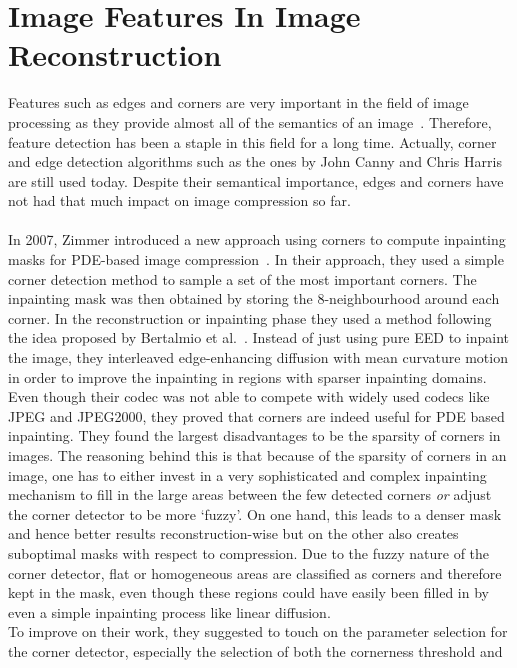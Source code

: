 \section{Image Features In Image Reconstruction}
Features such as edges and corners are very important in the field of image processing as they
provide almost all of the semantics of an image~\cite{marr82}. Therefore, feature detection has been a staple in
this field for a long time. Actually, corner and edge detection algorithms such as the ones by John Canny
and Chris Harris~\cite{harris88, canny86} are still used today. 
Despite their semantical importance, edges and corners have not had that much impact on image
compression so far.\\
\\
In 2007, Zimmer introduced a new approach using corners to compute inpainting masks for
PDE-based image compression~\cite{zimmer07}. In their approach, they used a simple corner detection method to
sample a set of the most important corners. The inpainting mask was then obtained by storing the
8-neighbourhood around each corner. In the reconstruction or inpainting phase they used a method
following the idea proposed by Bertalmio et al.~\cite{bertalmio00}. Instead of just using pure EED to
inpaint the image, they interleaved edge-enhancing diffusion with mean curvature motion in order to
improve the inpainting in regions with sparser inpainting domains. \\
Even though their codec was
not able to compete with widely used codecs like JPEG and JPEG2000, they proved that corners are
indeed useful for PDE based inpainting. They found the largest disadvantages to be the sparsity of
corners in images. The reasoning behind this is that because of the sparsity of corners in an
image, one has to either invest in a very sophisticated and complex inpainting mechanism to fill in
the large areas between the few detected corners \textit{or} adjust the corner detector to be more
`fuzzy'. On one hand, this leads to a denser mask and hence better results reconstruction-wise 
but on the other also creates suboptimal masks with respect to compression. Due to the fuzzy nature of the
corner detector, flat or homogeneous areas are classified as corners and therefore kept in the
mask, even though these regions could have easily been filled in by even a simple inpainting
process like linear diffusion. \\
To improve on their work, they suggested to touch on the parameter
selection for the corner detector, especially the selection of both the cornerness threshold and

